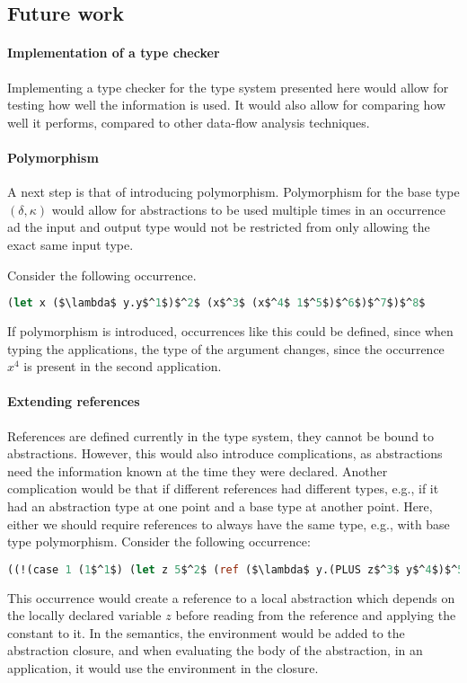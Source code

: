 \documentclass[acmsmall,sigplan]{acmart}
\begin{document}
\subsection{Future work}\label{sec:FW}

\paragraph{Implementation of a type checker}
Implementing a type checker for the type system presented here would allow for testing how well the information is used.
It would also allow for comparing how well it performs, compared to other data-flow analysis techniques.

\paragraph{Polymorphism}

A next step is that of introducing polymorphism. Polymorphism for the
base type $(\delta,\kappa)$ would allow for abstractions to be used
multiple times in an occurrence ad the input and output type would not
be restricted from only allowing the exact same input type.

Consider the following occurrence.

\begin{lstlisting}[language=Caml, mathescape=true]
(let x ($\lambda$ y.y$^1$)$^2$ (x$^3$ (x$^4$ 1$^5$)$^6$)$^7$)$^8$
\end{lstlisting}

If polymorphism is introduced, occurrences like this could be defined,
since when typing the applications, the type of the argument changes,
since the occurrence $x^4$ is present in the second application. 


\paragraph{Extending references}
References are defined currently in the type system, they cannot be bound to abstractions.
However, this would also introduce complications, as abstractions need the information known at the time they were declared.
Another complication would be that if different references had different types, e.g., if it had an abstraction type at one point and a base type at another point.
Here, either we should require references to always have the same type, e.g., with base type polymorphism.
Consider the following occurrence:
\begin{lstlisting}[language=Caml, mathescape=true]
((!(case 1 (1$^1$) (let z 5$^2$ (ref ($\lambda$ y.(PLUS z$^3$ y$^4$)$^5$)$^6$))$^7$)$^8$)$^9$ 5)$^{10}$
\end{lstlisting}
This occurrence would create a reference to a local abstraction which depends on the locally declared variable $z$ before reading from the reference and applying the constant to it.
In the semantics, the environment would be added to the abstraction closure, and when evaluating the body of the abstraction, in an application, it would use the environment in the closure.
\end{document}
